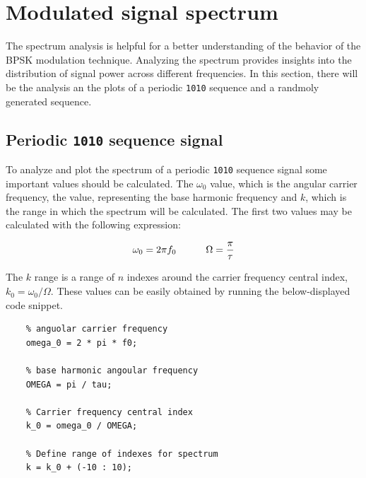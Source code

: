 \vspace{40px} \section{Modulated signal spectrum}
The spectrum analysis is helpful for a better understanding of the behavior of the BPSK modulation technique. Analyzing the spectrum provides insights into the distribution of signal power across different frequencies. In this section, there will be the analysis an the plots of a periodic \texttt{1010} sequence and a randmoly generated sequence.




\subsection{Periodic \texttt{1010} sequence signal}
To analyze and plot the spectrum of a periodic \texttt{1010} sequence signal some important values should be calculated. The $\omega_0$ value, which is the angular carrier frequency, the value, representing the base harmonic frequency and $k$, which is the range in which the spectrum will be calculated. The first two values may be calculated with the following expression:

\begin{equation*}
    \omega_0 = 2\pi f_0 \hspace{30px} \Omega = \frac{\pi}{\tau}
\end{equation*}

\noindent The $k$ range is a range of $n$ indexes around the carrier frequency central index, $k_0 = \omega_0 / \Omega$. These values can be easily obtained by running the below-displayed code snippet.

\begin{lstlisting}
    % anguolar carrier frequency
    omega_0 = 2 * pi * f0; 

    % base harmonic angoular frequency 
    OMEGA = pi / tau; 

    % Carrier frequency central index
    k_0 = omega_0 / OMEGA;

    % Define range of indexes for spectrum
    k = k_0 + (-10 : 10);
\end{lstlisting}

